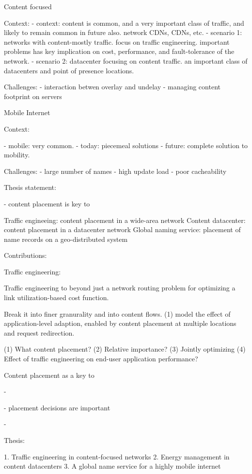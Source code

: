 Content focused

Context:
- context: content is common, and a very important class of traffic, and likely to remain common in future also. network CDNs, CDNs, etc.
- scenario 1: networks with content-mostly traffic. focus on traffic engineering. important problems has key implication on cost, performance, and fault-tolerance of the network. 
- scenario 2: datacenter focusing on content traffic. an important class of datacenters and point of presence locations. 

Challenges: 
- interaction betwen overlay and undelay
- managing content footprint on servers



Mobile Internet

Context:

- mobile: very common.
- today: piecemeal solutions
- future: complete solution to mobility.



Challenges:
- large number of names
- high update load
- poor cacheability



Thesis statement:

- content placement is key to 

Traffic engineeing: content placement in a wide-area network
Content datacenter: content placement in a datacenter network
Global naming service: placement of name records on a geo-distributed system


Contributions:

Traffic engineering:


Traffic engineering to beyond just a network routing problem for optimizing a link utilization-based cost function. 


Break it into finer granurality and into content flows. 
(1) model the effect of application-level adaption, enabled by content placement at multiple locations and request redirection.

(1) What content placement?
(2) Relative importance?
(3) Jointly optimizing
(4) Effect of traffic engineering on end-user application performance?






Content placement as a key to 

- 

- placement decisions are important

- 

Thesis: 

1. Traffic engineering in content-focused networks
2. Energy management in content datacenters
3. A global name service for a highly mobile internet

